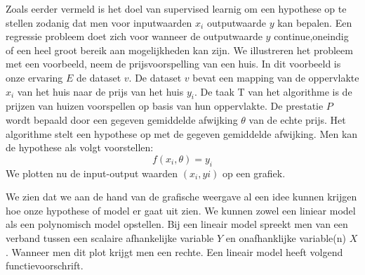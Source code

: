 Zoals eerder vermeld is het doel van supervised learnig om een hypothese op te stellen zodanig dat men voor inputwaarden $x_{i}$ outputwaarde $y$ kan bepalen. Een regressie probleem doet zich voor wanneer de outputwaarde $y$ continue,oneindig of een heel groot bereik aan mogelijkheden kan zijn. We illustreren het probleem met een voorbeeld, neem de prijsvoorspelling van een huis. 
In dit voorbeeld is onze ervaring $E$ de dataset $v$. De dataset $v$ bevat een mapping van de oppervlakte $x_{i}$ van het huis naar de prijs van het huis $y_{i}$. De taak T van het algorithme is de prijzen van huizen voorspellen op basis van hun oppervlakte. De prestatie $P$ wordt bepaald door een gegeven gemiddelde afwijking $\theta$ van de echte prijs. Het algorithme stelt een hypothese op met de gegeven gemiddelde afwijking. Men kan de hypothese als volgt voorstellen:
\[ f(x_{i},\theta) = y_{i} \] 
\newline
We plotten nu de input-output waarden $(x_{i},y{i})$ op een grafiek.
\newline
\begin{center}
\end{center}
\newline

 We zien dat we aan de hand van de grafische weergave al een idee kunnen krijgen hoe onze hypothese of model er gaat uit zien. We kunnen zowel een liniear model als een polynomisch model opstellen. Bij een lineair model spreekt men van een verband tussen een scalaire afhankelijke variable $Y$ en onafhanklijke variable(n) $X$. Wanneer men dit plot krijgt men een rechte. Een lineair model heeft volgend functievoorschrift.

